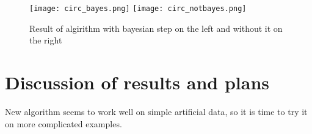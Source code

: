 \documentclass[tablecaption=bottom,wcp]{jmlr} %
\begin{document}
    
    

\begin{figure}[H]
    \centering
    {\texttt{[image: circ\_bayes.png]}}%
    \qquad
    {\texttt{[image: circ\_notbayes.png]}}%
    \caption{Result of algirithm with bayesian step on the left and without it on the right}%
    \label{fig:example}%
\end{figure}


\section{Discussion of results and plans}

New algorithm seems to work well on simple artificial data, so it is time to try it on more complicated examples. 
\end{document}
